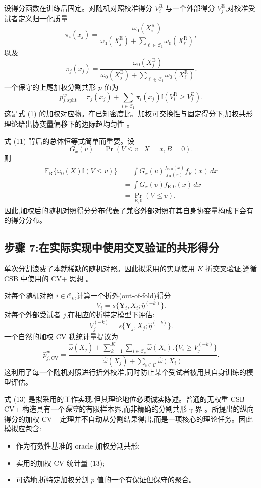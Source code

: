 \documentclass[11pt]{article}
\newcommand{\R}{\mathrm{R}}
\newcommand{\E}{\mathrm{E}}
\newcommand{\Exp}{\mathbb{E}}
\newcommand{\ind}{\mathbb{I}}
\begin{document}
设得分函数在训练后固定。对随机对照校准得分 $V_i^{\R}$ 与一个外部得分 $V_j^{\E}$,对校准受试者定义归一化质量
\[
\pi_i(x_j)
=
\frac{\omega_0(X_i^{\R})}
{\omega_0(X_j^{\E})+\sum_{\ell\in\mathcal C_1}\omega_0(X_\ell^{\R})},
\]
以及
\[
\pi_j(x_j)
=
\frac{\omega_0(X_j^{\E})}
{\omega_0(X_j^{\E})+\sum_{\ell\in\mathcal C_1}\omega_0(X_\ell^{\R})}.
\]
一个保守的上尾加权分割共形 $p$ 值为
\[
p_{j,\mathrm{split}}^{w}
=
\pi_j(x_j)
+
\sum_{i\in\mathcal C_1}\pi_i(x_j)
\ind(V_i^{\R}\ge V_j^{\E}).
\tag{11}
\]
这是式 (1) 的加权对应物。在已知密度比、加权可交换性与固定得分下,加权共形理论给出协变量偏移下的边际超均匀性 \citep{tibshirani2019weighted,jin2026weighted}。

式 (11) 背后的总体恒等式简单而重要。设
\[
G_x(v)=\Pr(V\le v\mid X=x,B=0).
\]
则
\[
\begin{aligned}
\Exp_{\R}\{\omega_0(X)\ind(V\le v)\}
&=\int G_x(v)\frac{f_{\E,0}(x)}{f_{\R}(x)}f_{\R}(x)\,dx\\
&=\int G_x(v)f_{\E,0}(x)\,dx\\
&=\Pr_{\E,0}(V\le v).
\end{aligned}
\tag{12}
\]
因此,加权后的随机对照得分分布代表了兼容外部对照在其自身协变量构成下会有的得分分布。

\subsection{步骤 7:在实际实现中使用交叉验证的共形得分}

单次分割浪费了本就稀缺的随机对照。因此拟采用的实现使用 $K$ 折交叉验证,遵循 CSB 中使用的 CV+ 思想 \citep{zhu2025csb,barber2021jackknife}。

对每个随机对照 $i\in\mathcal C_k$,计算一个折外(out-of-fold)得分
\[
V_i
=s\{\bm Y_i,X_i;\widehat\eta^{(-k)}\}.
\]
对每个外部受试者 $j$,在相应的折特定模型下评估:
\[
V_j^{(-k)}
=s\{\bm Y_j,X_j;\widehat\eta^{(-k)}\}.
\]
一个自然的加权 CV 秩统计量提议为
\[
\widehat p_{j,\mathrm{CV}}^{w}
=
\frac{
\widehat\omega(X_j)
+
\sum_{k=1}^{K}\sum_{i\in\mathcal C_k}
\widehat\omega(X_i)
\ind\{V_i\ge V_j^{(-k)}\}
}
{
\widehat\omega(X_j)
+
\sum_{i\in\mathcal C}\widehat\omega(X_i)
}.
\tag{13}
\]
这利用了每一个随机对照进行折外校准,同时防止某个受试者被用其自身训练的模型评估。

式 (13) 是拟采用的工作实现,但其理论地位必须诚实陈述。普通的无权重 CSB CV+ 构造具有一个\emph{保守}的有限样本界,而非精确的分割共形 $\gamma$ 界 \citep{zhu2025csb}。所提出的纵向得分的加权 CV+ 定理并不自动从分割结果得出,而是一项核心的理论任务。因此模拟应包含:
\begin{itemize}
    \item 作为有效性基准的 oracle 加权分割共形;
    \item 实用的加权 CV 统计量 (13);
    \item 可选地,折特定加权分割 $p$ 值的一个有保证但保守的聚合。
\end{itemize}
\end{document}
